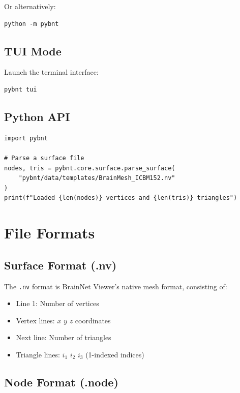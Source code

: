 \documentclass[11pt,a4paper]{article}
\begin{document}
Or alternatively:
\begin{lstlisting}
python -m pybnt
\end{lstlisting}

\subsection{TUI Mode}

Launch the terminal interface:

\begin{lstlisting}[caption=Launching TUI]
pybnt tui
\end{lstlisting}

\subsection{Python API}

\begin{lstlisting}[caption=Python API usage]
import pybnt

# Parse a surface file
nodes, tris = pybnt.core.surface.parse_surface(
    "pybnt/data/templates/BrainMesh_ICBM152.nv"
)
print(f"Loaded {len(nodes)} vertices and {len(tris)} triangles")
\end{lstlisting}

\section{File Formats}

\subsection{Surface Format (.nv)}

The \texttt{.nv} format is BrainNet Viewer's native mesh format, consisting of:
\begin{itemize}
    \item Line 1: Number of vertices
    \item Vertex lines: $x$ $y$ $z$ coordinates
    \item Next line: Number of triangles
    \item Triangle lines: $i_1$ $i_2$ $i_3$ (1-indexed indices)
\end{itemize}

\subsection{Node Format (.node)}
\end{document}
